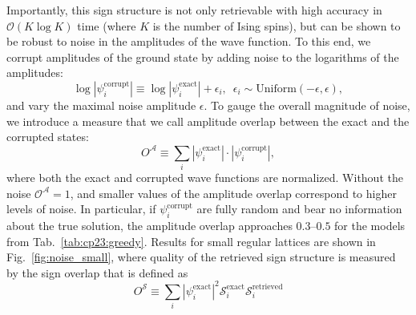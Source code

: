 Importantly, this sign structure is not only retrievable with high accuracy in $\mathcal{O}(K \log K)$ time (where $K$ is the number of Ising spins), but can be shown to be robust to noise in the amplitudes of the wave function. To this end, we corrupt amplitudes of the ground state by adding noise to the logarithms of the amplitudes:
\begin{equation}
    \log \left|\psi^\mathrm{corrupt}_i\right| \equiv \log \left|\psi^\mathrm{exact}_i\right| + \epsilon_i, \,\,\, \epsilon_i \sim \mbox{Uniform}(-\epsilon, \epsilon ), 
\end{equation}
and vary the maximal noise amplitude $\epsilon$. To gauge the overall magnitude of noise, we introduce a measure that we call amplitude overlap between the exact and the corrupted states:
\begin{equation}
    O^\mathcal{A} \equiv \sum_i |\psi^\mathrm{exact}_i|\cdot |\psi^\mathrm{corrupt}_i|,
\end{equation}
where both the exact and corrupted wave functions are normalized. Without the noise $\mathcal{O}^\mathcal{A} = 1$, and smaller values of the amplitude overlap correspond to higher levels of noise. In particular, if $\psi^\mathrm{corrupt}_i$ are fully random and bear no information about the true solution, the amplitude overlap approaches $0.3$--$0.5$ for the models from Tab.~\ref{tab:cp23:greedy}. Results for small regular lattices are shown in Fig.~\ref{fig:noise_small}, where quality of the retrieved sign structure is measured by the sign overlap that is defined as
\begin{equation}
    O^\mathcal{S} \equiv  \sum_i |\psi^\mathrm{exact}_i|^2 \mathcal{S}_i^\mathrm{exact}\mathcal{S}_i^\mathrm{retrieved}
\end{equation}



